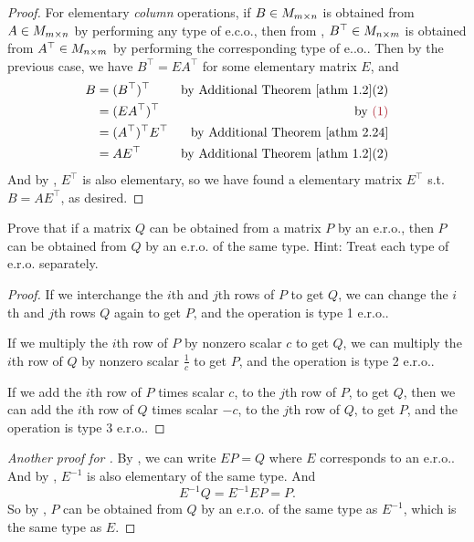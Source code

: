 \begin{proof}
For elementary \emph{column} operations, if \(B \in M_{m \times n}\) is obtained from \(A \in M_{m \times n}\) by performing any type of e.c.o.,
then from , \(B^\top \in M_{n \times m}\) is obtained from \(A^\top \in M_{n \times m}\) by performing the corresponding type of e..o..
Then by the previous case, we have \(B^\top = EA^\top\)  for some elementary matrix \(E\), and
\begin{align*}
    B & = (B^\top)^\top & \text{by \ATHM{1.2}(2)} \\
      & = (EA^\top)^\top & \text{by \MAROON{(1)}} \\
      & = (A^\top)^\top E^\top & \text{by \ATHM{2.24}} \\
      & = A E^\top & \text{by \ATHM{1.2}(2)}
\end{align*}
And by , \(E^\top\) is also elementary, so we have found a elementary matrix \(E^\top\) s.t. \(B = A E^\top\), as desired.
\end{proof}

\begin{exercise} \label{exercise 3.1.8}
Prove that if a matrix \(Q\) can be obtained from a matrix \(P\) by an e.r.o., then \(P\) can be obtained from \(Q\) by an e.r.o. of the same type.
Hint: Treat each type of e.r.o. separately.
\end{exercise}

\begin{proof}
If we interchange the \(i\)th and \(j\)th rows of \(P\) to get \(Q\), we can change the \(i\)th and \(j\)th rows \(Q\) again to get \(P\), and the operation is type 1 e.r.o..

If we multiply the \(i\)th row of \(P\) by nonzero scalar \(c\) to get \(Q\), we can multiply the \(i\)th row of \(Q\) by nonzero scalar \(\frac1{c}\) to get \(P\), and the operation is type 2 e.r.o..

If we add the \(i\)th row of \(P\) times scalar \(c\), to the \(j\)th row of \(P\), to get \(Q\), then we can add the \(i\)th row of \(Q\) times scalar \(-c\), to the \(j\)th row of \(Q\), to get \(P\), and the operation is type 3 e.r.o..
\end{proof}

\begin{proof} [Another proof for ]
By , we can write \(EP = Q\) where \(E\) corresponds to an e.r.o..
And by , \(E^{-1}\) is also elementary of the same type.
And
\[
    E^{-1} Q = E^{-1} E P = P.
\]
So by , \(P\) can be obtained from \(Q\) by an e.r.o. of the same type as \(E^{-1}\), which is the same type as \(E\).
\end{proof}

